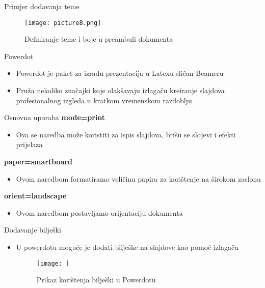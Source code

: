 \documentclass{beamer}
\begin{document}
\begin{frame}{Primjer dodavanja teme}
		 \begin{figure}
		\texttt{[image: picture8.png]} 
		\caption{Definiranje teme i boje u preambuli dokumenta}
	\end{figure}
\end{frame}
\begin{frame}{Powerdot}
 		\begin{itemize}
 			\item Powerdot je paket za izradu prezentacija u  Latexu sličan Beameru
 			\item Pruža nekoliko značajki koje olakšavaju izlagaču kreiranje slajdova profesionalnog izgleda u kratkom vremenskom razdoblju
 		\end{itemize}
\end{frame}
\begin{frame}{Osnovna uporaba}
\textbf{mode=print}
\begin{itemize}
 	\item Ova se naredba može koristiti za ispis slajdova, brišu se slojevi i efekti prijelaza
\end{itemize}
\textbf{paper=smartboard}
\begin{itemize}
    \item Ovom naredbom formatiramo veličinu papira za korištenje na širokom zaslonu 
\end{itemize}
\textbf{orient=landscape}
\begin{itemize}
    \item Ovom naredbom postavljamo orijentaciju dokumenta
\end{itemize}
\end{frame}
\begin{frame}{Dodavanje bilješki}
\begin{itemize}
    \item U powerdotu moguće je dodati bilješke na slajdove kao pomoć izlagaču
\begin{figure}
	\texttt{[image: ]}
	\caption{Prikaz korištenja bilješki u Powerdotu}
\end{figure}
\end{itemize}
\end{frame}
\end{document}
